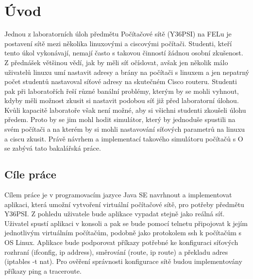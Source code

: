 \chapter{Úvod}




Jednou z laboratorních úloh předmětu Počítačové sítě (Y36PSI) na FELu je postavení sítě mezi několika linuxovými a ciscovými počítači. Studenti, kteří tento úkol vykonávají, nemají často s takovou činností žádnou osobní zkušenost. Z přednášek většinou vědí, jak by měli síť očíslovat, avšak jen několik málo uživatelů linuxu umí nastavit adresy a brány na počítači s linuxem a jen nepatrný počet studentů nastavoval síťové adresy na skutečném Cisco routeru. Studenti pak při laboratořích řeší různé banální problémy, kterým by se mohli vyhnout, kdyby měli možnost zkusit si nastavit podobou síť již před laboratorní úlohou. Kvůli kapacitě laboratoře však není možné, aby si všichni studenti zkoušeli úlohu předem. Proto by se jim mohl hodit simulátor, který by jednoduše spustili na svém počítači a na kterém by si mohli nastavování síťových parametrů na linuxu a ciscu zkusit. Právě návrhem a implementací takového simulátoru počítačů s O se zabývá tato bakalářská práce. 


\section{Cíle práce}

Cílem práce je v programovacím jazyce Java SE navrhnout a implementovat aplikaci, která umožní vytvoření virtuální počítačové sítě, pro potřeby předmětu Y36PSI. Z pohledu uživatele bude aplikace vypadat stejně jako reálná síť. Uživatel spustí aplikaci v konsoli a pak se bude pomocí telnetu připojovat k jejím jednotlivým virtuálním počítačům, podobně jako protokolem ssh k počítačům s OS Linux. Aplikace bude podporovat příkazy potřebné ke konfiguraci síťových rozhraní (ifconfig, ip address), směrování (route, ip route) a překladu adres (iptables -t nat). Pro ověření správnosti konfigurace sítě budou implementovány příkazy ping a traceroute.

